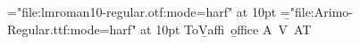 \font\a="file:lmroman10-regular.otf:mode=harf" at 10pt
\font\b="file:Arimo-Regular.ttf:mode=harf" at 10pt
\hbox{\a To\b Va\a ffi \b office}
\hbox{\a A\kern1pt V AT}
